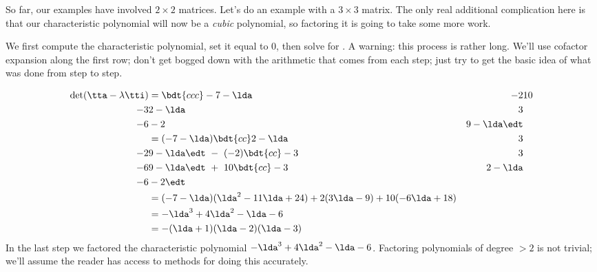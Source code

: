 So far, our examples have involved $2\times 2$ matrices. Let's do an example with a $3\times 3$ matrix. The only real additional complication here is that our characteristic polynomial will now be a \textit{cubic} polynomial, so factoring it is going to take some more work.

\medskip

{We first compute the characteristic polynomial, set it equal to 0, then solve for \lda. A warning: this process is rather long. We'll use cofactor expansion along the first row; don't get bogged down with the arithmetic that comes from each step; just try to get the basic idea of what was done from step to step.

\begin{align*}
\det(\tta-\lambda\tti) &= \bdt{ccc} -7-\lda & -2 & 10 \\-3 & 2-\lda & 3\\ -6 & -2 & 9-\lda \edt \\
										&= (-7-\lda)\bdt{cc}2-\lda & 3\\-2 & 9-\lda\edt\ -\ (-2)\bdt{cc} -3&3\\-6 & 9-\lda \edt\ +\ 10\bdt{cc} -3&2-\lda \\-6 & -2 \edt \\
										&= (-7-\lda)(\lda^2-11\lda + 24) + 2(3\lda-9)+10(-6\lda+18)\\
										&= -\lda^3+4\lda^2-\lda -6\\
										&= -(\lda + 1)(\lda-2)(\lda-3)
\end{align*}
In the last step we factored the characteristic polynomial $-\lda^3+4\lda^2-\lda -6$. Factoring polynomials of degree $>2$ is not trivial; we'll assume the reader has access to methods for doing this accurately. 

}
